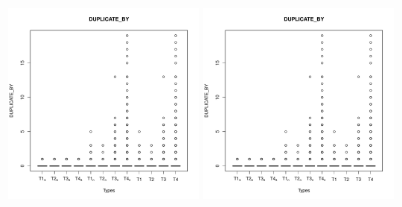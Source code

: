 \documentclass[natbib]{svjour3}
\begin{document}
\begin{figure}
\includegraphics[page=5, width=0.45\textwidth]{extract/Rplots}
\includegraphics[page=6, width=0.45\textwidth]{extract/Rplots}
\label{fig:boxplots}
\end{figure}
\end{document}
